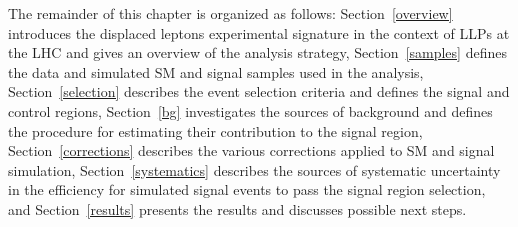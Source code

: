The remainder of this chapter is organized as follows: Section~\ref{overview} introduces the displaced leptons experimental signature in the context of LLPs at the LHC and gives an overview of the analysis strategy, Section~\ref{samples} defines the data and simulated SM and signal samples used in the analysis, Section~\ref{selection} describes the event selection criteria and defines the signal and control regions, Section~\ref{bg} investigates the sources of background and defines the procedure for estimating their contribution to the signal region, Section~\ref{corrections} describes the various corrections applied to SM and signal simulation, Section~\ref{systematics} describes the sources of systematic uncertainty in the efficiency for simulated signal events to pass the signal region selection, and Section~\ref{results} presents the results and discusses possible next steps.






